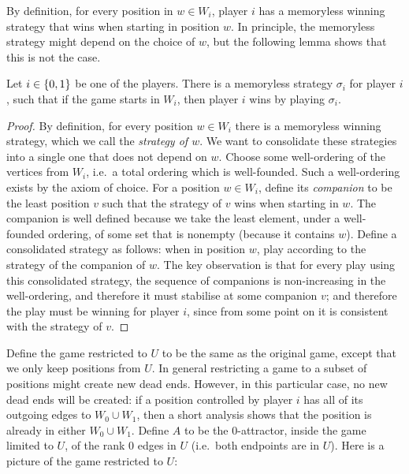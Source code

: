 By definition, for every position in $w \in W_i$, player $i$ has a memoryless winning strategy that wins when starting in position $w$. In principle, the memoryless strategy might depend on the choice of $w$, but the following lemma shows that this is not the case.
\begin{lemma}\label{lem:unique-memoryless}
Let $i \in \{0,1\}$ be one of the players. There is a memoryless strategy $\sigma_i$ for player $i$, such that if the game starts in $W_i$, then player $i$ wins by playing $\sigma_i$.
\end{lemma}
\begin{proof}
By definition, for every position $w \in W_i$ there is a memoryless winning strategy, which we call the \emph{strategy of $w$}. We want to consolidate these strategies into a single one that does not depend on $w$.  	Choose some well-ordering of the vertices from $W_i$, i.e.~a total ordering which is well-founded. Such a well-ordering exists by the axiom of choice. For a position  $w \in W_i$, define its \emph{companion} to be the least position $v$ such that the strategy of $v$  wins when starting in $w$.
The companion is well defined because we take the least element, under a well-founded ordering, of some set that is nonempty (because it contains $w$). Define a consolidated strategy as follows: when in position $w$, play according to the strategy of the companion of $w$. 
The key observation is that for every play using this consolidated strategy, the sequence of companions is non-increasing in the well-ordering, and therefore it must stabilise at some  companion $v$; and therefore the play must be winning for player $i$, since from some point on it is consistent with the strategy of $v$.
\end{proof}

Define the game restricted to $U$ to be the same as the original game, except that we only keep positions from $U$. In general restricting a game to a subset of positions might create new dead ends. However, in this particular case, no new dead ends will be created: if a position controlled by player $i$ has all of its outgoing edges to $W_0 \cup W_1$, then a short analysis shows that the position is already in either $W_0 \cup W_1$. 
Define $A$ to be the $0$-attractor, inside the game limited to $U$, of the rank $0$ edges in $U$ (i.e.~both endpoints are in  $U$). Here is a picture of the game restricted to $U$:

